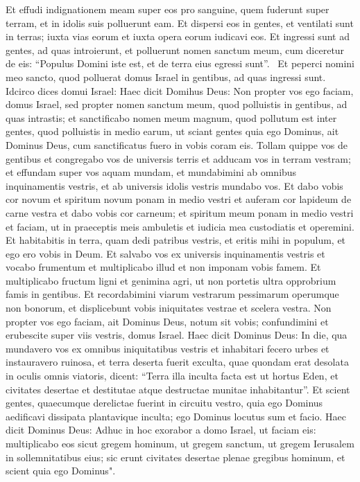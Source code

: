 \begin{biblechapter}
\verse Et effudi indignationem meam super eos pro sanguine, quem fuderunt super terram, et in idolis suis polluerunt eam. 
\verse Et dispersi eos in gentes, et ventilati sunt in terras; iuxta vias eorum et iuxta opera eorum iudicavi eos.  
\verse Et ingressi sunt ad gentes, ad quas introierunt, et polluerunt nomen sanctum meum, cum diceretur de eis: “Populus Domini iste est, et de terra eius egressi sunt”.  
\verse Et peperci nomini meo sancto, quod polluerat domus Israel in gentibus, ad quas ingressi sunt. 
\verse Idcirco dices domui Israel: Haec dicit Domihus Deus: Non propter vos ego faciam, domus Israel, sed propter nomen sanctum meum, quod polluistis in gentibus, ad quas intrastis; 
\verse et sanctificabo nomen meum magnum, quod pollutum est inter gentes, quod polluistis in medio earum, ut sciant gentes quia ego Dominus, ait Dominus Deus, cum sanctificatus fuero in vobis coram eis.  
\verse Tollam quippe vos de gentibus et congregabo vos de universis terris et adducam vos in terram vestram; 
\verse et effundam super vos aquam mundam, et mundabimini ab omnibus inquinamentis vestris, et ab universis idolis vestris mundabo vos. 
\verse Et dabo vobis cor novum et spiritum novum ponam in medio vestri et auferam cor lapideum de carne vestra et dabo vobis cor carneum; 
\verse et spiritum meum ponam in medio vestri et faciam, ut in praeceptis meis ambuletis et iudicia mea custodiatis et operemini. 
\verse Et habitabitis in terra, quam dedi patribus vestris, et eritis mihi in populum, et ego ero vobis in Deum. 
\verse Et salvabo vos ex universis inquinamentis vestris et vocabo frumentum et multiplicabo illud et non imponam vobis famem. 
\verse Et multiplicabo fructum ligni et genimina agri, ut non portetis ultra opprobrium famis in gentibus. 
\verse Et recordabimini viarum vestrarum pessimarum operumque non bonorum, et displicebunt vobis iniquitates vestrae et scelera vestra. 
\verse Non propter vos ego faciam, ait Dominus Deus, notum sit vobis; confundimini et erubescite super viis vestris, domus Israel. 
\verse Haec dicit Dominus Deus: In die, qua mundavero vos ex omnibus iniquitatibus vestris et inhabitari fecero urbes et instauravero ruinosa, 
\verse et terra deserta fuerit exculta, quae quondam erat desolata in oculis omnis viatoris,  
\verse dicent: “Terra illa inculta facta est ut hortus Eden, et civitates desertae et destitutae atque destructae munitae inhabitantur”. 
\verse Et scient gentes, quaecumque derelictae fuerint in circuitu vestro, quia ego Dominus aedificavi dissipata plantavique inculta; ego Dominus locutus sum et facio. 
\verse Haec dicit Dominus Deus: Adhuc in hoc exorabor a domo Israel, ut faciam eis: multiplicabo eos sicut gregem hominum, 
\verse ut gregem sanctum, ut gregem Ierusalem in sollemnitatibus eius; sic erunt civitates desertae plenae gregibus hominum, et scient quia ego Dominus". 
\end{biblechapter}

